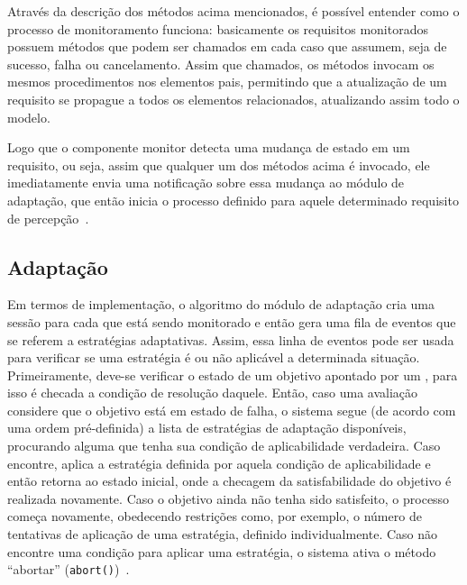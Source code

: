 Através da descrição dos métodos acima mencionados, é possível entender como o processo de monitoramento funciona: basicamente os requisitos monitorados possuem métodos que podem ser chamados em cada caso que assumem, seja de sucesso, falha ou cancelamento. Assim que chamados, os métodos invocam os mesmos procedimentos nos elementos pais, permitindo que a atualização de um requisito se propague a todos os elementos relacionados, atualizando assim todo o modelo.

Logo que o componente monitor detecta uma mudança de estado em um requisito, ou seja, assim que qualquer um dos métodos acima é invocado, ele imediatamente envia uma notificação sobre essa mudança ao módulo de adaptação, que então inicia o processo definido para aquele determinado requisito de percepção~\cite{tesevitor}.

\subsection{Adaptação}
\label{sec-referencial-zanshin-adaptacao}
Em termos de implementação, o algoritmo do módulo de adaptação cria uma sessão para cada \awreq que está sendo monitorado e então gera uma fila de eventos que se referem a estratégias adaptativas. Assim, essa linha de eventos pode ser usada para verificar se uma estratégia é ou não aplicável a determinada situação. Primeiramente, deve-se verificar o estado de um objetivo apontado por um \awreq, para isso é checada a condição de resolução daquele. Então, caso uma avaliação considere que o objetivo está em estado de falha, o sistema segue (de acordo com uma ordem pré-definida) a lista de estratégias de adaptação disponíveis, procurando alguma que tenha sua condição de aplicabilidade verdadeira. Caso encontre, aplica a estratégia definida por aquela condição de aplicabilidade e então retorna ao estado inicial, onde a checagem da satisfabilidade do objetivo é realizada novamente. Caso o objetivo ainda não tenha sido satisfeito, o processo começa novamente, obedecendo restrições como, por exemplo, o número de tentativas de aplicação de uma estratégia, definido individualmente. Caso não encontre uma condição para aplicar uma estratégia, o sistema ativa o método ``abortar'' (\texttt{abort()})~\cite{souza2013requirements}. 

